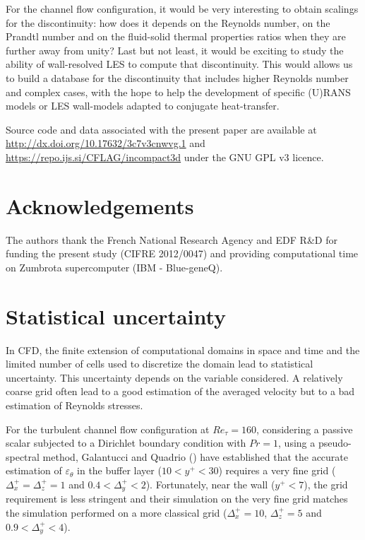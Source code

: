 \documentclass[review]{elsarticle}
\begin{document}
For the channel flow configuration, it would be very interesting to obtain scalings for the discontinuity: how does it depends on the Reynolds number, on the Prandtl number and on the fluid-solid thermal properties ratios when they are further away from unity?
Last but not least, it would be exciting to study the ability of wall-resolved LES to compute that discontinuity.
This would allows us to build a database for the discontinuity that includes higher Reynolds number and complex cases, with the hope to help the development of specific (U)RANS models or LES wall-models adapted to conjugate heat-transfer.

{\color{red} Source code and data associated with the present paper are available at \url{http://dx.doi.org/10.17632/3c7v3cnwvg.1} and \url{https://repo.ijs.si/CFLAG/incompact3d} under the GNU GPL v3 licence.}

\section{Acknowledgements}
The authors thank the French National Research Agency and EDF R\&D for funding the present study (CIFRE 2012/0047) and providing computational time on Zumbrota supercomputer (IBM - Blue-geneQ).

\appendix

\section{Statistical uncertainty}
In CFD, the finite extension of computational domains in space and time and the limited number of cells used to discretize the domain lead to statistical uncertainty.
This uncertainty depends on the variable considered.
A relatively coarse grid often lead to a good estimation of the averaged velocity but to a bad estimation of Reynolds stresses.

For the turbulent channel flow configuration at $Re_\tau = 160$, considering a passive scalar subjected to a Dirichlet boundary condition with $Pr = 1$, using a pseudo-spectral method, Galantucci and Quadrio (\cite{galantucci2010very}) have established that the accurate estimation of $\varepsilon_\theta$ in the buffer layer ($10 < y^+ < 30$) requires a very fine grid ($\Delta_x^+ = \Delta_z^+ = 1$ and $0.4 < \Delta_y^+ < 2$).
Fortunately, near the wall ($y^+ < 7$), the grid requirement is less stringent and their simulation on the very fine grid matches the simulation performed on a more classical grid ($\Delta_x^+ = 10$, $\Delta_z^+ = 5$ and $0.9 < \Delta_y^+ < 4$).
\end{document}
